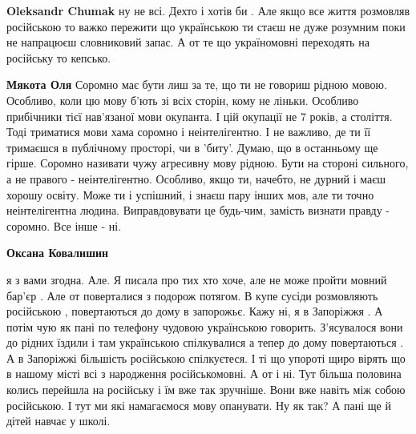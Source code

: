 \begin{itemize}
\begin{itemize}
\textbf{Oleksandr Chumak} ну не всі. Дехто і хотів би . Але якщо все життя
розмовляв російською то важко пережити що українською ти стаєш не дуже розумним
поки не напрацюєш словниковий запас. А от те що україномовні переходять на
російську то кепсько.

 
\textbf{Мякота Оля} Соромно має бути лиш за те, що ти не говориш рідною мовою. Особливо, коли цю мову б'ють зі всіх сторін, кому не ліньки. Особливо прибічники тієї нав'язаної мови окупанта. І цій окупації не 7 років, а століття. Тоді триматися мови хама соромно і неінтелігентно. І не важливо, де ти її тримаєшся в публічному просторі, чи в 'биту'. Думаю, що в останньому ще гірше. Соромно називати чужу агресивну мову рідною. Бути на стороні сильного, а не правого - неінтелігентно. Особливо, якщо ти, начебто, не дурний і маєш хорошу освіту. Може ти і успішний, і знаєш пару інших мов, але ти точно неінтелігентна людина. Виправдовувати це будь-чим, замість визнати правду - соромно. Все інше - ні.

 
\textbf{Оксана Ковалишин} 

я з вами згодна. Але. Я писала про тих хто хоче, але не може пройти мовний
бар'єр . Але от поверталися з подорож потягом. В купе сусіди розмовляють
російською , повертаються до дому в запорожьє. Кажу ні, я в Запоріжжя . А потім
чую як пані по телефону чудовою українською говорить. З'ясувалося вони до
рідних їздили і там українською спілкувалися а тепер до дому повертаються . А в
Запоріжжі більшість російською спілкуєтеся. І ті що упороті щиро вірять що в
нашому місті всі з народження російськомовні. А от і ні. Тут більша половина
колись перейшла на російську і їм вже так зручніше. Вони вже навіть між собою
російською. І тут ми які намагаємося мову опанувати. Ну як так? А пані ще й
дітей навчає у школі.

 

\end{itemize}
\end{itemize}
